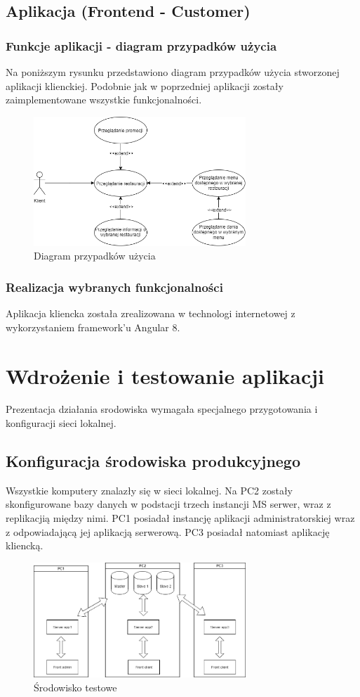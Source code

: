 \documentclass{article}
\begin{document}
	\subsection{Aplikacja (Frontend - Customer)}
		\subsubsection{Funkcje aplikacji - diagram przypadków użycia}
		Na poniższym rysunku przedstawiono diagram przypadków użycia stworzonej aplikacji klienckiej. Podobnie jak w poprzedniej aplikacji zostały zaimplementowane wszystkie funkcjonalności.
			\begin{figure}[hbt!]
				\includegraphics[width=8cm]{Files/Pictures/UMLCustomerApp}
				\centering
				\caption{Diagram przypadków użycia}
			\end{figure}
		\subsubsection{Realizacja wybranych funkcjonalności}	
		Aplikacja kliencka została zrealizowana w technologi internetowej z wykorzystaniem framework'u Angular 8.
		
\section{Wdrożenie i testowanie aplikacji}
Prezentacja działania srodowiska wymagała specjalnego przygotowania i konfiguracji sieci lokalnej.
\subsection{Konfiguracja środowiska produkcyjnego}
	Wszystkie komputery znalazły się w sieci lokalnej. Na PC2 zostały skonfigurowane bazy danych w podstacji trzech instancji MS serwer, wraz z replikacjią między nimi. PC1 posiadał instancję aplikacji administratorskiej wraz z odpowiadającą jej aplikacją serwerową. PC3 posiadał natomiast aplikację kliencką.


	\begin{figure}[hbt!]
		\includegraphics[width=8cm]{Files/Pictures/setup}
		\centering
		\caption{Środowisko testowe}
	\end{figure}
\end{document}
